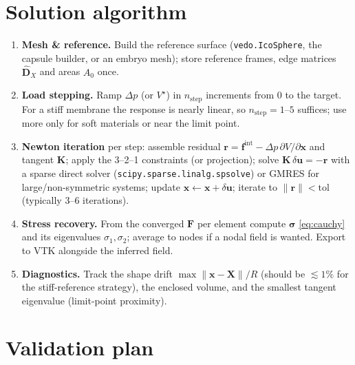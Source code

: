 \documentclass[11pt]{article}
\newcommand{\vv}[1]{\bm{#1}}          %
\newcommand{\FF}{\vv{F}}               %
\newcommand{\sg}{\vv{\sigma}}          %
\newcommand{\xx}{\vv{x}}               %
\newcommand{\XX}{\vv{X}}               %
\begin{document}
\section{Solution algorithm}
\label{sec:solve}

\begin{enumerate}[label=\arabic*.,nosep]
  \item \textbf{Mesh \& reference.} Build the reference surface (\texttt{vedo.IcoSphere},
        the capsule builder, or an embryo mesh); store reference frames, edge matrices
        $\hat{\vv D}_X$ and areas $A_0$ once.
  \item \textbf{Load stepping.} Ramp $\Delta p$ (or $V^\star$) in $n_{\text{step}}$
        increments from $0$ to the target. For a stiff membrane the response is nearly
        linear, so $n_{\text{step}}=1$--$5$ suffices; use more only for soft materials or
        near the limit point.
  \item \textbf{Newton iteration} per step: assemble residual
        $\vv r=\vv f^{\mathrm{int}}-\Delta p\,\partial V/\partial\xx$ and tangent
        $\vv K$; apply the 3--2--1 constraints (or projection); solve
        $\vv K\,\delta\vv u=-\vv r$ with a sparse direct solver
        (\texttt{scipy.sparse.linalg.spsolve}) or GMRES for large/non-symmetric systems;
        update $\xx\leftarrow\xx+\delta\vv u$; iterate to $\|\vv r\|<\text{tol}$
        (typically 3--6 iterations).
  \item \textbf{Stress recovery.} From the converged $\FF$ per element compute
        $\sg$ \eqref{eq:cauchy} and its eigenvalues $\sigma_1,\sigma_2$; average to nodes
        if a nodal field is wanted. Export to VTK alongside the inferred field.
  \item \textbf{Diagnostics.} Track the shape drift $\max\|\xx-\XX\|/R$ (should be
        $\lesssim1\%$ for the stiff-reference strategy), the enclosed volume, and the
        smallest tangent eigenvalue (limit-point proximity).
\end{enumerate}

\section{Validation plan}
\label{sec:validation}
\end{document}
